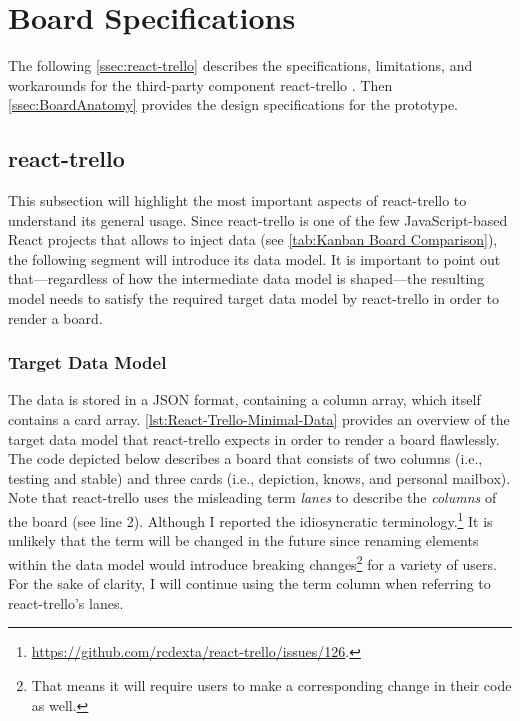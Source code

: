 \newpage

\section{Board Specifications}\label{sec:RMB}

The following \autoref{ssec:react-trello} describes the specifications, limitations, and workarounds for the third-party component react-trello \parencite{Ramachandran2017}. Then \autoref{ssec:BoardAnatomy} provides the design specifications for the prototype.

\subsection{react-trello}\label{ssec:react-trello}

This subsection will highlight the most important aspects of react-trello to understand its general usage. Since react-trello is one of the few JavaScript-based React projects that allows to inject data (see \autoref{tab:Kanban Board Comparison}), the following segment will introduce its data model. It is important to point out that—regardless of how the intermediate data model is shaped—the resulting model needs to satisfy the required target data model by react-trello in order to render a board.


\subsubsection{Target Data Model}

The data is stored in a \acrshort*{JSON} format, containing a column array, which itself contains a card array. \autoref{lst:React-Trello-Minimal-Data} provides an overview of the target data model that react-trello expects in order to render a board flawlessly. The code depicted below describes a board that consists of two columns (i.e., testing and stable) and three cards (i.e., depiction, knows, and personal mailbox). Note that react-trello uses the misleading term \textit{lanes} to describe the \textit{columns} of the board (see line 2). Although I reported the idiosyncratic terminology.\footnote{\url{https://github.com/rcdexta/react-trello/issues/126}.} It is unlikely that the term will be changed in the future since renaming elements within the data model would introduce breaking changes\footnote{That means it will require users to make a corresponding change in their code as well.} for a variety of users. For the sake of clarity, I will continue using the term column when referring to react-trello’s lanes.


